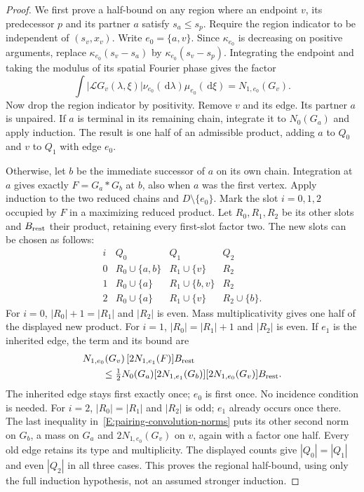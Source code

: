 \documentclass[12pt,oneside,openany]{book}
\numberwithin{equation}{section}
\theoremstyle{nogostyle}
\theoremstyle{definition}
\newcommand{\ud}{\,\mathrm{d}}
\begin{document}
\begin{proof}
  We first prove a half-bound on any region where an endpoint $v$, its
  predecessor $p$ and its partner $a$ satisfy $s_a \le s_p$. Require the region
  indicator to be independent of $(s_v,x_v)$. Write $e_0 = \{a,v\}$. Since
  $\kappa_{e_0}$ is decreasing on positive arguments, replace
  $\kappa_{e_0}(s_v-s_a)$ by $\kappa_{e_0}(s_v-s_p)$. Integrating the endpoint
  and taking the modulus of its spatial Fourier phase gives the factor
  \[
    \int |\mathcal{L} G_v(\lambda,\xi)|
    \nu_{e_0}(\ud\lambda)\mu_{e_0}(\ud\xi)=N_{1,e_0}(G_v).
  \]
  Now drop the region indicator by positivity. Remove $v$ and its edge. Its
  partner $a$ is unpaired. If $a$ is terminal in its remaining chain, integrate
  it to $N_0(G_a)$ and apply induction. The result is one half of an admissible
  product, adding $a$ to $Q_0$ and $v$ to $Q_1$ with edge $e_0$.

  Otherwise, let $b$ be the immediate successor of $a$ on its own chain.
  Integration at $a$ gives exactly $F = G_a*G_b$ at $b$, also when $a$ was the
  first vertex. Apply induction to the two reduced chains and
  $D\setminus\{e_0\}$. Mark the slot $i = 0,1,2$ occupied by $F$ in a maximizing
  reduced product. Let $R_0,R_1,R_2$ be its other slots and $B_{\rm rest}$ their
  product, retaining every first-slot factor two. The new slots can be chosen as
  follows:
  \[
    \begin{array}{c|ccc}
      i&Q_0&Q_1&Q_2\\ \hline
      0&R_0\cup\{a,b\}&R_1\cup\{v\}&R_2\\
      1&R_0\cup\{a\}&R_1\cup\{b,v\}&R_2\\
      2&R_0\cup\{a\}&R_1\cup\{v\}&R_2\cup\{b\}.
    \end{array}
  \]
  For $i = 0$, $|R_0|+1 = |R_1|$ and $|R_2|$ is even. Mass multiplicativity
  gives one half of the displayed new product. For $i = 1$, $|R_0| = |R_1|+1$
  and $|R_2|$ is even. If $e_1$ is the inherited edge, the term and its bound
  are
  \begin{align*}
    &N_{1,e_0}(G_v)\,[2N_{1,e_1}(F)]B_{\rm rest}\\
    &\qquad\le\tfrac12N_0(G_a)
    [2N_{1,e_1}(G_b)][2N_{1,e_0}(G_v)]B_{\rm rest}.
  \end{align*}
  The inherited edge stays first exactly once; $e_0$ is first once. No incidence
  condition is needed. For $i = 2$, $|R_0| = |R_1|$ and $|R_2|$ is odd; $e_1$
  already occurs once there. The last inequality
  in~\eqref{E:pairing-convolution-norms} puts its other second norm on $G_b$, a
  mass on $G_a$ and $2N_{1,e_0}(G_v)$ on $v$, again with a factor one half.
  Every old edge retains its type and multiplicity. The displayed counts give
  $|Q_0| = |Q_1|$ and even $|Q_2|$ in all three cases. This proves the regional
  half-bound, using only the full induction hypothesis, not an assumed stronger
  induction.



\end{proof}
\end{document}
